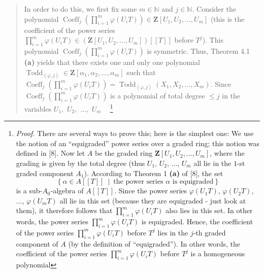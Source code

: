 \documentclass[numbers=enddot,12pt,final,onecolumn,notitlepage]{scrartcl}%
\begin{document}
\begin{quote}
In order to do this, we first fix some $m\in\mathbb{N}$ and $j\in\mathbb{N}$.
Consider the polynomial $\operatorname*{Coeff}\nolimits_{j}\left(
\prod\limits_{i=1}^{m}\varphi\left(  U_{i}T\right)  \right)  \in
\mathbf{Z}\left[  U_{1},U_{2},...,U_{m}\right]  $ (this is the coefficient of
the power series $\prod\limits_{i=1}^{m}\varphi\left(  U_{i}T\right)
\in\left(  \mathbf{Z}\left[  U_{1},U_{2},...,U_{m}\right]  \right)  \left[
\left[  T\right]  \right]  $ before $T^{j}$). This polynomial
$\operatorname*{Coeff}\nolimits_{j}\left(  \prod\limits_{i=1}^{m}%
\varphi\left(  U_{i}T\right)  \right)  $ is symmetric. Thus, Theorem 4.1
\textbf{(a)} yields that there exists one and only one polynomial
$\operatorname*{Todd}\nolimits_{\left(  \varphi,j\right)  }\in\mathbf{Z}%
\left[  \alpha_{1},\alpha_{2},...,\alpha_{m}\right]  $ such that
$\operatorname*{Coeff}\nolimits_{j}\left(  \prod\limits_{i=1}^{m}%
\varphi\left(  U_{i}T\right)  \right)  =\operatorname*{Todd}\nolimits_{\left(
\varphi,j\right)  }\left(  X_{1},X_{2},...,X_{m}\right)  $. Since
$\operatorname*{Coeff}\nolimits_{j}\left(  \prod\limits_{i=1}^{m}%
\varphi\left(  U_{i}T\right)  \right)  $ is a polynomial of total degree $\leq
j$ in the variables $U_{1},$ $U_{2},$ $...,$ $U_{m}\ \ \ \ $%
\footnote{\textit{Proof.} There are several ways to prove this; here is the
simplest one: We use the notion of an ``equigraded'' power series over a graded
ring; this notion was defined in [8]. Now let $A$ be the graded ring
$\mathbf{Z}\left[  U_{1},U_{2},...,U_{m}\right]  $, where the grading is given
by the total degree (thus $U_{1}$, $U_{2}$, $...$, $U_{m}$ all lie in the
$1$-st graded component $A_{1}$). According to Theorem 1 \textbf{(a)} of [8],
the set%
\[
\left\{  \alpha\in A\left[  \left[  T\right]  \right]  \ \mid\ \text{the power
series }\alpha\text{ is equigraded}\right\}
\]
is a sub-$A_{0}$-algebra of $A\left[  \left[  T\right]  \right]  $. Since the
power series $\varphi\left(  U_{1}T\right)  $, $\varphi\left(  U_{2}T\right)
$, $...$, $\varphi\left(  U_{m}T\right)  $ all lie in this set (because they
are equigraded - just look at them), it therefore follows that $\prod
\limits_{i=1}^{m}\varphi\left(  U_{i}T\right)  $ also lies in this set. In
other words, the power series $\prod\limits_{i=1}^{m}\varphi\left(
U_{i}T\right)  $ is equigraded. Hence, the coefficient of the power series
$\prod\limits_{i=1}^{m}\varphi\left(  U_{i}T\right)  $ before $T^{j}$ lies in
the $j$-th graded component of $A$ (by the definition of ``equigraded''). In
other words, the coefficient of the power series $\prod\limits_{i=1}%
^{m}\varphi\left(  U_{i}T\right)  $ before $T^{j}$ is a homogeneous polynomial
}
\end{quote}
\end{document}
